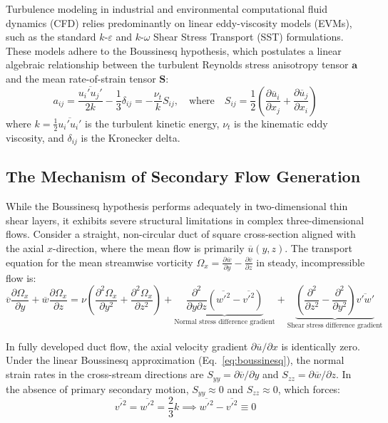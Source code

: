 \documentclass[11pt,a4paper]{article}
\begin{document}
Turbulence modeling in industrial and environmental computational fluid dynamics (CFD) relies predominantly on linear eddy-viscosity models (EVMs), such as the standard $k$-$\varepsilon$ and $k$-$\omega$ Shear Stress Transport (SST) formulations. These models adhere to the Boussinesq hypothesis, which postulates a linear algebraic relationship between the turbulent Reynolds stress anisotropy tensor $\mathbf{a}$ and the mean rate-of-strain tensor $\mathbf{S}$:
\begin{equation}
a_{ij} = \frac{\overline{u_i' u_j'}}{2k} - \frac{1}{3}\delta_{ij} = -\frac{\nu_t}{k} S_{ij}, \quad \text{where} \quad S_{ij} = \frac{1}{2}\left(\frac{\partial \overline{u}_i}{\partial x_j} + \frac{\partial \overline{u}_j}{\partial x_i}\right)
\label{eq:boussinesq}
\end{equation}
where $k = \frac{1}{2}\overline{u_i' u_i'}$ is the turbulent kinetic energy, $\nu_t$ is the kinematic eddy viscosity, and $\delta_{ij}$ is the Kronecker delta.

\subsection{The Mechanism of Secondary Flow Generation}
While the Boussinesq hypothesis performs adequately in two-dimensional thin shear layers, it exhibits severe structural limitations in complex three-dimensional flows. Consider a straight, non-circular duct of square cross-section aligned with the axial $x$-direction, where the mean flow is primarily $\overline{u}(y,z)$. The transport equation for the mean streamwise vorticity $\Omega_x = \frac{\partial \overline{w}}{\partial y} - \frac{\partial \overline{v}}{\partial z}$ in steady, incompressible flow is:
\begin{equation}
\overline{v}\frac{\partial \Omega_x}{\partial y} + \overline{w}\frac{\partial \Omega_x}{\partial z} = \nu \left(\frac{\partial^2 \Omega_x}{\partial y^2} + \frac{\partial^2 \Omega_x}{\partial z^2}\right) + \underbrace{\frac{\partial^2}{\partial y \partial z}\left(\overline{w'^2} - \overline{v'^2}\right)}_{\text{Normal stress difference gradient}} + \underbrace{\left(\frac{\partial^2}{\partial z^2} - \frac{\partial^2}{\partial y^2}\right)\overline{v'w'}}_{\text{Shear stress difference gradient}}
\label{eq:vorticity}
\end{equation}

In fully developed duct flow, the axial velocity gradient $\partial \overline{u}/\partial x$ is identically zero. Under the linear Boussinesq approximation (Eq.~\ref{eq:boussinesq}), the normal strain rates in the cross-stream directions are $S_{yy} = \partial \overline{v}/\partial y$ and $S_{zz} = \partial \overline{w}/\partial z$. In the absence of primary secondary motion, $S_{yy} \approx 0$ and $S_{zz} \approx 0$, which forces:
\begin{equation}
\overline{v'^2} = \overline{w'^2} = \frac{2}{3}k \implies \overline{w'^2} - \overline{v'^2} \equiv 0
\end{equation}
\end{document}
